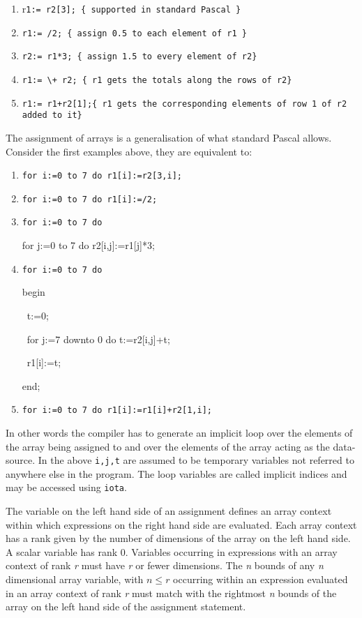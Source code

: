 {\begin{enumerate}
\item r\texttt{1:= r2{[}3{]}; \{ supported in standard Pascal \}}
\item \texttt{r1:= /2; \{ assign 0.5 to each element of r1 \}}
\item \texttt{r2:= r1{*}3; \{ assign 1.5 to every element of r2\}}
\item \texttt{r1:= \textbackslash{}+ r2; \{ r1 gets the totals along the rows of r2\}}
\item \texttt{r1:= r1+r2{[}1{]};\{ r1 gets the corresponding elements of row 1 of
r2 added to it\}}
\end{enumerate}
The assignment of arrays is a generalisation of what standard Pascal allows.
Consider the first examples above, they are equivalent to:

\begin{enumerate}
\item \texttt{for i:=0 to 7 do r1{[}i{]}:=r2{[}3,i{]};}
\item \texttt{for i:=0 to 7 do r1{[}i{]}:=/2;}
\item {\tt for i:=0 to 7 do 

for j:=0 to 7 do r2{[}i,j{]}:=r1{[}j{]}{*}3;}
\item {\tt for i:=0 to 7 do 

begin 

\ t:=0; 

\ for j:=7 downto 0 do t:=r2{[}i,j{]}+t;

\ r1{[}i{]}:=t; 

end;}
\item \texttt{for i:=0 to 7 do r1{[}i{]}:=r1{[}i{]}+r2{[}1,i{]};}
\end{enumerate}
In other words the compiler has to generate an implicit loop over
the elements of the array being assigned to and over the elements of the array
acting as the data-source. In the above \texttt{i,j,t} are assumed to be temporary
variables not referred to anywhere else in the program. The loop variables are
called implicit indices \label{manimplicitindices}and
may be accessed using \texttt{iota}. 

The variable on the left hand side of an assignment defines an array
context within which expressions on the right hand side are evaluated. Each
array context has a rank given by the number of dimensions
of the array on the left hand side. A scalar variable has rank
0. Variables occurring in expressions with an array context of rank \emph{r}
must have \emph{r} or fewer dimensions. The \emph{n} bounds of any \emph{n}
dimensional array variable, with $ n\leq r $ occurring within an expression
evaluated in an array context of rank \emph{r} must match with the rightmost
\emph{n} bounds of the array on the left hand side of the assignment statement. 

}
